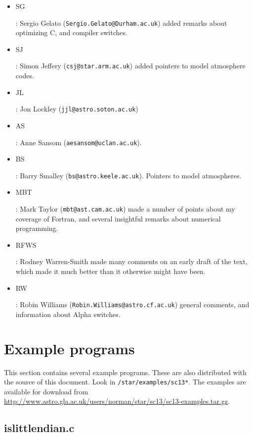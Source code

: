 \documentclass[11pt,oneside,chapters]{starlink}
\begin{document}
\begin{itemize}
\item
\hypertarget{ta:sg}{SG}: Sergio Gelato
(\texttt{Sergio.Gelato@Durham.ac.uk}) added remarks
about optimizing C, and compiler switches.

\item
\hypertarget{ta:sj}{SJ}: Simon Jeffery
(\texttt{csj@star.arm.ac.uk}) added pointers to model
atmosphere codes.

\item
\hypertarget{ta:jl}{JL}: Jon Lockley
(\texttt{jjl@astro.soton.ac.uk})

\item
\hypertarget{ta:as}{AS}: Anne Sansom
(\texttt{aesansom@uclan.ac.uk}).

\item
\hypertarget{ta:bs}{BS}: Barry Smalley
(\texttt{bs@astro.keele.ac.uk}). Pointers to model
atmospheres.

\item
\hypertarget{ta:mbt}{MBT}: Mark Taylor
(\texttt{mbt@ast.cam.ac.uk}) made a number of points
about my coverage of Fortran, and several insightful
remarks about numerical programming.

\item
\hypertarget{ta:rfws}{RFWS}: Rodney Warren-Smith made many
comments on an early draft of the text, which made it
much better than it otherwise might have been.

\item
\hypertarget{ta:rw}{RW}: Robin Williams
(\texttt{Robin.Williams@astro.cf.ac.uk}) general
comments, and information about Alpha switches.
\end{itemize}

\appendix

\chapter{Example programs}
\label{s:examples}


This section contains several example programs.  These are also
distributed with the source of this document.  Look in \texttt{/star/examples/sc13*}.  The examples are available
for download from
\url{http://www.astro.gla.ac.uk/users/norman/star/sc13/sc13-examples.tar.gz}.

\section{islittlendian.c}
\label{a:islittleendian:c}
\end{document}

